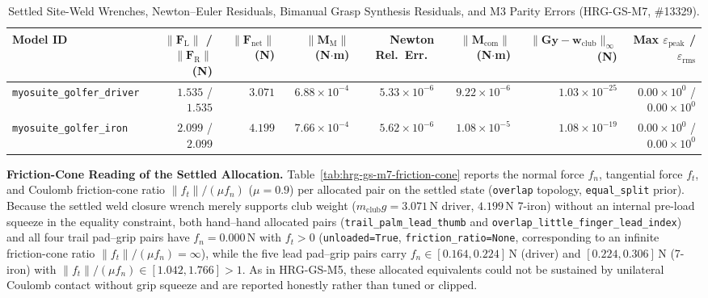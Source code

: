 \documentclass[11pt,a4paper]{article}
\begin{document}
\begin{table}[h!]
\centering
\caption{Settled Site-Weld Wrenches, Newton--Euler Residuals, Bimanual Grasp Synthesis Residuals, and M3 Parity Errors (HRG-GS-M7, \#13329).}
\label{tab:hrg-gs-m7-parity}
\small
\begin{tabular}{lrrrrrrr}
\toprule
Model ID & $\|\mathbf{F}_{\mathrm{L}}\|$ / $\|\mathbf{F}_{\mathrm{R}}\|$ (N) & $\|\mathbf{F}_{\mathrm{net}}\|$ (N) & $\|\mathbf{M}_{\mathrm{M}}\|$ (N$\cdot$m) & Newton Rel.\ Err.\ & $\|\mathbf{M}_{\mathrm{com}}\|$ (N$\cdot$m) & $\|\mathbf{G}\mathbf{y} - \mathbf{w}_{\mathrm{club}}\|_{\infty}$ (N) & Max $\varepsilon_{\mathrm{peak}}$ / $\varepsilon_{\mathrm{rms}}$ \\
\midrule
\texttt{myosuite\_golfer\_driver} & $1.535$ / $1.535$ & $3.071$ & $6.88 \times 10^{-4}$ & $5.33 \times 10^{-6}$ & $9.22 \times 10^{-6}$ & $1.03 \times 10^{-25}$ & $0.00 \times 10^{0}$ / $0.00 \times 10^{0}$ \\
\texttt{myosuite\_golfer\_iron} & $2.099$ / $2.099$ & $4.199$ & $7.66 \times 10^{-4}$ & $5.62 \times 10^{-6}$ & $1.08 \times 10^{-5}$ & $1.08 \times 10^{-19}$ & $0.00 \times 10^{0}$ / $0.00 \times 10^{0}$ \\
\bottomrule
\end{tabular}
\end{table}

\textbf{Friction-Cone Reading of the Settled Allocation.}
Table~\ref{tab:hrg-gs-m7-friction-cone} reports the normal force $f_n$, tangential force $f_t$, and Coulomb friction-cone ratio $\|f_t\| / (\mu f_n)$ ($\mu = 0.9$) per allocated pair on the settled state (\texttt{overlap} topology, \texttt{equal\_split} prior). Because the settled weld closure wrench merely supports club weight ($m_{\mathrm{club}} g = 3.071\,\mathrm{N}$ driver, $4.199\,\mathrm{N}$ 7-iron) without an internal pre-load squeeze in the equality constraint, both hand--hand allocated pairs (\texttt{trail\_palm\_lead\_thumb} and \texttt{overlap\_little\_finger\_lead\_index}) and all four trail pad--grip pairs have $f_n = 0.000\,\mathrm{N}$ with $f_t > 0$ (\texttt{unloaded=True}, \texttt{friction\_ratio=None}, corresponding to an infinite friction-cone ratio $\|f_t\|/(\mu f_n) = \infty$), while the five lead pad--grip pairs carry $f_n \in [0.164, 0.224]\,\mathrm{N}$ (driver) and $[0.224, 0.306]\,\mathrm{N}$ (7-iron) with $\|f_t\| / (\mu f_n) \in [1.042, 1.766] > 1$. As in HRG-GS-M5, these allocated equivalents could not be sustained by unilateral Coulomb contact without grip squeeze and are reported honestly rather than tuned or clipped.
\end{document}
